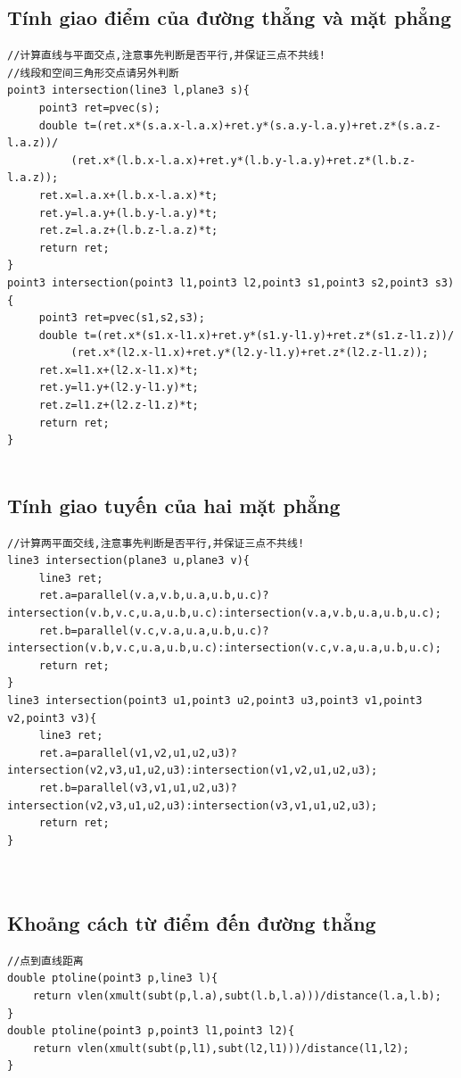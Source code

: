 \documentclass[11pt]{article}
\begin{document}
\subsection{Tính giao điểm của đường thẳng và mặt phẳng}
\begingroup
\scriptsize
\begin{verbatim}
//计算直线与平面交点,注意事先判断是否平行,并保证三点不共线!
//线段和空间三角形交点请另外判断
point3 intersection(line3 l,plane3 s){
     point3 ret=pvec(s);
     double t=(ret.x*(s.a.x-l.a.x)+ret.y*(s.a.y-l.a.y)+ret.z*(s.a.z-l.a.z))/
          (ret.x*(l.b.x-l.a.x)+ret.y*(l.b.y-l.a.y)+ret.z*(l.b.z-l.a.z));
     ret.x=l.a.x+(l.b.x-l.a.x)*t;
     ret.y=l.a.y+(l.b.y-l.a.y)*t;
     ret.z=l.a.z+(l.b.z-l.a.z)*t;
     return ret;
}
point3 intersection(point3 l1,point3 l2,point3 s1,point3 s2,point3 s3){
     point3 ret=pvec(s1,s2,s3);
     double t=(ret.x*(s1.x-l1.x)+ret.y*(s1.y-l1.y)+ret.z*(s1.z-l1.z))/
          (ret.x*(l2.x-l1.x)+ret.y*(l2.y-l1.y)+ret.z*(l2.z-l1.z));
     ret.x=l1.x+(l2.x-l1.x)*t;
     ret.y=l1.y+(l2.y-l1.y)*t;
     ret.z=l1.z+(l2.z-l1.z)*t;
     return ret;
}


\end{verbatim}
\endgroup
\subsection{Tính giao tuyến của hai mặt phẳng}
\begingroup
\scriptsize
\begin{verbatim}
//计算两平面交线,注意事先判断是否平行,并保证三点不共线!
line3 intersection(plane3 u,plane3 v){
     line3 ret;
     ret.a=parallel(v.a,v.b,u.a,u.b,u.c)?
intersection(v.b,v.c,u.a,u.b,u.c):intersection(v.a,v.b,u.a,u.b,u.c);
     ret.b=parallel(v.c,v.a,u.a,u.b,u.c)?
intersection(v.b,v.c,u.a,u.b,u.c):intersection(v.c,v.a,u.a,u.b,u.c);
     return ret;
}
line3 intersection(point3 u1,point3 u2,point3 u3,point3 v1,point3 v2,point3 v3){
     line3 ret;
     ret.a=parallel(v1,v2,u1,u2,u3)?intersection(v2,v3,u1,u2,u3):intersection(v1,v2,u1,u2,u3);
     ret.b=parallel(v3,v1,u1,u2,u3)?intersection(v2,v3,u1,u2,u3):intersection(v3,v1,u1,u2,u3);
     return ret;
}



\end{verbatim}
\endgroup
\subsection{Khoảng cách từ điểm đến đường thẳng}
\begingroup
\scriptsize
\begin{verbatim}
//点到直线距离
double ptoline(point3 p,line3 l){
    return vlen(xmult(subt(p,l.a),subt(l.b,l.a)))/distance(l.a,l.b);
}
double ptoline(point3 p,point3 l1,point3 l2){
    return vlen(xmult(subt(p,l1),subt(l2,l1)))/distance(l1,l2);
}


\end{verbatim}
\endgroup
\end{document}
